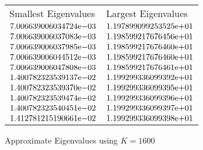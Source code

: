 \begin{enumerate}
\begin{figure}
 \centering    
\begin{tabular}{ ||p{6cm}||p{6cm}|}
\hline
 Smallest Eigenvalues & Largest Eigenvalues \\ \hhline{|=|=|}     
\hline
${7.006639006034724}\mathrm{e}{-03}$ & ${1.197899099253525}\mathrm{e}{+01}$ \\  
${7.006639006037083}\mathrm{e}{-03}$ & ${1.198599217676456}\mathrm{e}{+01}$ \\  
${7.006639006037985}\mathrm{e}{-03}$ & ${1.198599217676460}\mathrm{e}{+01}$ \\  
${7.006639006044512}\mathrm{e}{-03}$ & ${1.198599217676460}\mathrm{e}{+01}$ \\  
${7.006639006047808}\mathrm{e}{-03}$ & ${1.198599217676461}\mathrm{e}{+01}$ \\  
${1.400782323539137}\mathrm{e}{-02}$ & ${1.199299336099392}\mathrm{e}{+01}$ \\  
${1.400782323539370}\mathrm{e}{-02}$ & ${1.199299336099395}\mathrm{e}{+01}$ \\  
${1.400782323539474}\mathrm{e}{-02}$ & ${1.199299336099396}\mathrm{e}{+01}$ \\  
${1.400782323540451}\mathrm{e}{-02}$ & ${1.199299336099397}\mathrm{e}{+01}$ \\  
${1.412781215190661}\mathrm{e}{-02}$ & ${1.199299336099398}\mathrm{e}{+01}$ \\  
\hline  
\end{tabular} 
\caption{Approximate Eigenvalues using $K = 1600$}
   \label{tab:eig1600}
\end{figure} 


\end{enumerate}
